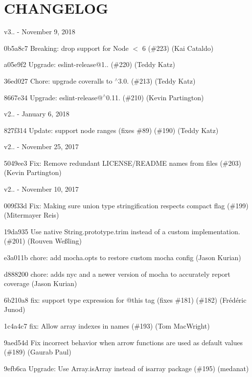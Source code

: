 \chapter{CHANGELOG}
\hypertarget{md_pkiclassroomrescheduler_2src_2main_2frontend_2node__modules_2eslint_2node__modules_2doctrine_2_c_h_a_n_g_e_l_o_g}{}\label{md_pkiclassroomrescheduler_2src_2main_2frontend_2node__modules_2eslint_2node__modules_2doctrine_2_c_h_a_n_g_e_l_o_g}
v3.. -\/ November 9, 2018


\begin{DoxyItemize}
\item 0b5a8c7 Breaking\+: drop support for Node \texorpdfstring{$<$}{<} 6 (\#223) (Kai Cataldo)
\item a05e9f2 Upgrade\+: eslint-\/release@1.. (\#220) (Teddy Katz)
\item 36ed027 Chore\+: upgrade coveralls to \texorpdfstring{$^\wedge$}{\string^}3.0. (\#213) (Teddy Katz)
\item 8667e34 Upgrade\+: eslint-\/release@\texorpdfstring{$^\wedge$}{\string^}0.11. (\#210) (Kevin Partington)
\end{DoxyItemize}

v2.. -\/ January 6, 2018


\begin{DoxyItemize}
\item 827f314 Update\+: support node ranges (fixes \#89) (\#190) (Teddy Katz)
\end{DoxyItemize}

v2.. -\/ November 25, 2017


\begin{DoxyItemize}
\item 5049ee3 Fix\+: Remove redundant LICENSE/\+README names from files (\#203) (Kevin Partington)
\end{DoxyItemize}

v2.. -\/ November 10, 2017


\begin{DoxyItemize}
\item 009f33d Fix\+: Making sure union type stringification respects compact flag (\#199) (Mitermayer Reis)
\item 19da935 Use native String.\+prototype.\+trim instead of a custom implementation. (\#201) (Rouven Weßling)
\item e3a011b chore\+: add mocha.\+opts to restore custom mocha config (Jason Kurian)
\item d888200 chore\+: adds nyc and a newer version of mocha to accurately report coverage (Jason Kurian)
\item 6b210a8 fix\+: support type expression for @this tag (fixes \#181) (\#182) (Frédéric Junod)
\item 1c4a4c7 fix\+: Allow array indexes in names (\#193) (Tom Mac\+Wright)
\item 9aed54d Fix incorrect behavior when arrow functions are used as default values (\#189) (Gaurab Paul)
\item 9efb6ca Upgrade\+: Use Array.\+is\+Array instead of isarray package (\#195) (medanat)
\end{DoxyItemize}

